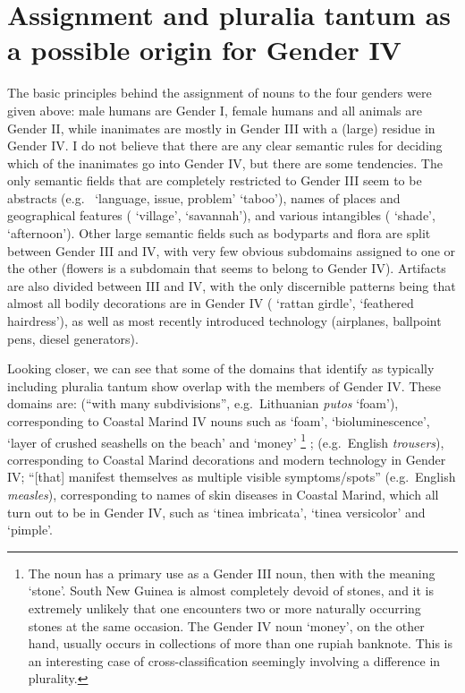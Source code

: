 \documentclass[output=collectionpaper]{langsci/langscibook}
\begin{document}
\section{Assignment and pluralia tantum as a possible origin for Gender IV}
\label{sec:Bruno:Mar-assignment}
The basic principles behind the assignment of nouns to the four genders were given above: male humans are Gender I, female humans and all animals are Gender II, while inanimates are mostly in Gender III with a (large) residue in Gender IV. I do not believe that there are any clear semantic rules for deciding which of the inanimates go into Gender IV, but there are some tendencies. The only semantic fields that are completely restricted to Gender III seem to be abstracts (e.g.\  `language, issue, problem'  `taboo'), names of places and geographical features ( `village',  `savannah'), and various intangibles ( `shade',  `afternoon'). Other large semantic fields such as bodyparts and flora are split between Gender III and IV, with very few obvious subdomains assigned to one or the other (flowers is a subdomain that seems to belong to Gender IV). Artifacts are also divided between III and IV, with the only discernible patterns being that almost all bodily decorations are in Gender IV ( `rattan girdle',  `feathered hairdress'), as well as most recently introduced technology (airplanes, ballpoint pens, diesel generators).

Looking closer, we can see that some of the domains that \cite[630]{Koptjevskaja-Tamm2001} identify as typically including pluralia tantum show overlap with the members of Gender IV. These domains are:  (``with many subdivisions'', e.g.\ Lithuanian \emph{putos} `foam'), corresponding to Coastal Marind IV nouns such as  `foam',  `bioluminescence',  `layer of crushed seashells on the beach' and  `money'%
\footnote{%
The noun  has a primary use as a Gender III noun, then with the meaning `stone'. South New Guinea is almost completely devoid of stones, and it is extremely unlikely that one encounters two or more naturally occurring stones at the same occasion. The Gender IV noun `money', on the other hand, usually occurs in collections of more than one rupiah banknote. This is an interesting case of cross-classification seemingly involving a difference in plurality.
}%
;  (e.g.\ English \emph{trousers}), corresponding to Coastal Marind decorations and modern technology in Gender IV;  ``[that] manifest themselves as multiple visible symptoms/spots'' (e.g.\ English \emph{measles}), corresponding to names of skin diseases in Coastal Marind, which all turn out to be in Gender IV, such as  `tinea imbricata',  `tinea versicolor' and  `pimple'.
\end{document}
